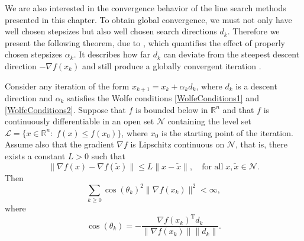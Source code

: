 We are also interested in the convergence behavior of the line search methods presented in this chapter. To obtain global convergence, we must not only have well chosen stepsizes but also well chosen search directions $d_k$. Therefore we present the following theorem, due to \cite{Zoutendijk:1970}, which quantifies the effect of properly chosen stepsizes $\alpha_k$. It describes how far $d_k$ can deviate from the steepest descent direction $-\nabla f(x_k)$ and still produce a globally convergent iteration \cite[p.~38]{NocedalWright:2006}.

\begin{theorem}\label{ZoutendijkTheorem}
    Consider any iteration of the form $x_{k+1} = x_k + \alpha_k d_k$, where $d_k$ is a descent direction and $\alpha_k$ satisfies the Wolfe conditions \cref{WolfeConditions1} and \cref{WolfeConditions2}. Suppose that $f$ is bounded below in $\mathbb{R}^n$ and that $f$ is continuously differentiable in an open set $\mathcal{N}$ containing the level set $\mathcal{L} = \{ x \in \mathbb{R}^n \colon \; f(x) \leq f(x_0) \}$, where $x_0$ is the starting point of the iteration. Assume also that the gradient $\nabla f$ is Lipschitz continuous on $\mathcal{N}$, that is, there exists a constant $L > 0$ such that
    \begin{equation*}
        \lVert \nabla f(x) - \nabla f(\tilde{x}) \rVert \leq L \lVert x - \tilde{x} \rVert, \quad \text{for all} \; x, \tilde{x} \in \mathcal{N}.
    \end{equation*}
    Then
    \begin{equation}\label{ZoutendijkCondition}
        \sum_{k \geq 0} \cos(\theta_k)^2 \lVert \nabla f(x_k) \rVert^2 < \infty,
    \end{equation}
    where
    \begin{equation*}
        \cos(\theta_k) = - \frac{\nabla f(x_k)^{\mathrm{T}} d_k}{\lVert \nabla f(x_k) \rVert \lVert d_k \rVert}.
    \end{equation*}    
\end{theorem}

